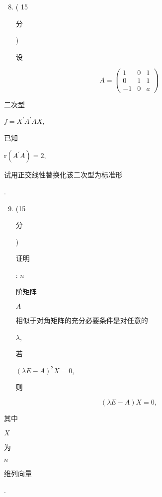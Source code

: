 \documentclass[10pt]{article}
\begin{document}
\begin{enumerate}
  \setcounter{enumi}{7}
  \item ( 15 \begin{CJK}{UTF8}{mj}分\end{CJK}) \begin{CJK}{UTF8}{mj}设\end{CJK}
\end{enumerate}
$$
A=\left(\begin{array}{ccc}
1 & 0 & 1 \\
0 & 1 & 1 \\
-1 & 0 & a
\end{array}\right)
$$
\begin{CJK}{UTF8}{mj}二次型\end{CJK} $f=X^{\prime} A^{\prime} A X$, \begin{CJK}{UTF8}{mj}已知\end{CJK} $\mathrm{r}\left(A^{\prime} A\right)=2$, \begin{CJK}{UTF8}{mj}试用正交线性替换化该二次型为标准形\end{CJK}.

\begin{enumerate}
  \setcounter{enumi}{8}
  \item (15 \begin{CJK}{UTF8}{mj}分\end{CJK}) \begin{CJK}{UTF8}{mj}证明\end{CJK}: $n$ \begin{CJK}{UTF8}{mj}阶矩阵\end{CJK} $A$ \begin{CJK}{UTF8}{mj}相似于对角矩阵的充分必要条件是对任意的\end{CJK} $\lambda$, \begin{CJK}{UTF8}{mj}若\end{CJK} $(\lambda E-A)^{2} X=0$, \begin{CJK}{UTF8}{mj}则\end{CJK}
\end{enumerate}
$$
(\lambda E-A) X=0,
$$
\begin{CJK}{UTF8}{mj}其中\end{CJK} $X$ \begin{CJK}{UTF8}{mj}为\end{CJK} $n$ \begin{CJK}{UTF8}{mj}维列向量\end{CJK}.
\end{document}
